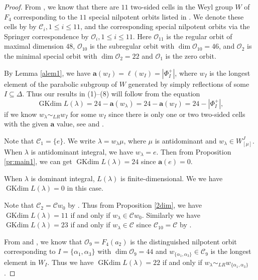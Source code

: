 \documentclass[reqno,12pt]{amsart}
\numberwithin{equation}{section}
\theoremstyle{plain}
\theoremstyle{definition}
\renewcommand{\subset}{\subseteq}
\newcommand{\aff}{ \mathbf{a} }
\newcommand{\gkd}{\operatorname{GKdim}}
\newcommand{\lest}{\leqslant}
\begin{document}
\begin{proof}
    
  From \cite[\S 8.4]{CM}, we know that there are $11$ two-sided cells in the Weyl group $W$ of $F_4$ corresponding to the $11$ special nilpotent orbits listed in \cite[Table in page 128]{CM}. We denote these cells by by  $\mathcal{C}_i, 1\lest i\lest 11$, and the corresponding special nilpotent orbits via the Springer correspondence by $\mathcal{O}_i, 1\lest i\lest 11$. Here $\mathcal{O}_{11}$ is the regular orbit of maximal dimension $48$, $\mathcal{O}_{10}$ is the subregular orbit with $\dim \mathcal{O}_{10}=46$, and $\mathcal{O}_2$ is the minimal special orbit with $\dim \mathcal{O}_2=22$ and $\mathcal{O}_1$ is the zero orbit. 

By Lemma \ref{alem1}, we have $ \aff(w_I)=\ell(w_I)=|\Phi_I^+|$, where $ w_I $ is the longest element of the parabolic subgroup of $ W $ generated by simply reflections of some $ I\subset \Delta $. Thus our results in (1)--(8)  will follow from the equation 
$$\gkd L(\lambda)=24-\aff(w_{\lambda})=24-\aff(w_I)=24-|\Phi_I^+|,$$ 
if we know $w_{\lambda}\sim_{LR} w_I$ for some $w_{I}$ since there is only one or two two-sided cells with the given $\aff$ value, see \cite[Chapter 8]{CM} and \cite[\S 13.3]{Ca85}.



  
 Note that $ \mathcal{C}_1=\{e\}$.  We write $\lambda=w_{\lambda}\mu$, where $\mu$ is antidominant and $w_{\lambda}\in W_{[\mu]}^J$. When $\lambda$ is antidominant integral, we have $w_{\lambda}=e$.  Then from Proposition \ref{pr:main1}, we can get $\gkd L(\lambda)=24$ since $\aff(e)=0$. 
  
  When $\lambda$ is dominant integral, $L(\lambda)$ is finite-dimensional. We we have  $\gkd L(\lambda)=0$ in this case. 
  
   Note that  $ \mathcal{C}_2=\mathcal{C}w_0$ by \cite[Lem. 3.5]{BMXX}. Thus from Proposition \ref{2dim}, we have $\gkd L(\lambda)=11$ if and only if $w_{\lambda}\in \mathcal{C}w_0 $. Similarly  we have $\gkd L(\lambda)=23$ if and only if $w_{\lambda}\in \mathcal{C} $ since  $ \mathcal{C}_{10}=\mathcal{C}$ by \cite[Lem. 3.5]{BMXX}.

From \cite{BC76} and \cite[\S 8.4]{CM}, we know that $\mathcal{O}_{9}=F_4(a_2)$ is the distinguished nilpotent orbit corresponding to $I=\{\alpha_1,\alpha_3\}$  with $\dim \mathcal{O}_{9}=44$ and $w_{\{\alpha_1,\alpha_3\}}\in \mathcal{C}_9$ is the longest element in $W_{I}$. Thus we have $\gkd L(\lambda)=22$ if and only if $w_{\lambda}\sim_{LR} w_{\{\alpha_1,\alpha_3\}} $.


\end{proof}
\end{document}
